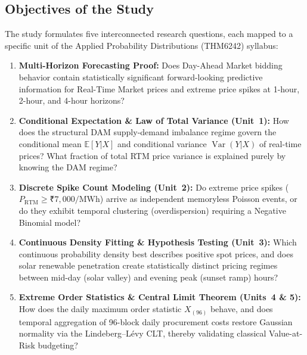 \documentclass[12pt, a4paper]{article}
\theoremstyle{definition}
\newcommand{\MWh}{\text{MWh}}
\newcommand{\rtm}{\text{RTM}}
\begin{document}
\subsection{Objectives of the Study}

The study formulates five interconnected research questions, each mapped to a specific unit of the Applied Probability Distributions (THM6242) syllabus:

\begin{enumerate}[label=\textbf{RQ\arabic*:}, leftmargin=1.5cm]
    \item \textbf{Multi-Horizon Forecasting Proof:} Does Day-Ahead Market bidding behavior contain statistically significant forward-looking predictive information for Real-Time Market prices and extreme price spikes at 1-hour, 2-hour, and 4-hour horizons?

    \item \textbf{Conditional Expectation \& Law of Total Variance (Unit~1):} How does the structural DAM supply-demand imbalance regime govern the conditional mean $\mathbb{E}[Y|X]$ and conditional variance $\operatorname{Var}(Y|X)$ of real-time prices? What fraction of total RTM price variance is explained purely by knowing the DAM regime?

    \item \textbf{Discrete Spike Count Modeling (Unit~2):} Do extreme price spikes ($P_{\rtm} \geq \text{₹}7{,}000/\MWh$) arrive as independent memoryless Poisson events, or do they exhibit temporal clustering (overdispersion) requiring a Negative Binomial model?

    \item \textbf{Continuous Density Fitting \& Hypothesis Testing (Unit~3):} Which continuous probability density best describes positive spot prices, and does solar renewable penetration create statistically distinct pricing regimes between mid-day (solar valley) and evening peak (sunset ramp) hours?

    \item \textbf{Extreme Order Statistics \& Central Limit Theorem (Units~4 \& 5):} How does the daily maximum order statistic $X_{(96)}$ behave, and does temporal aggregation of 96-block daily procurement costs restore Gaussian normality via the Lindeberg--L\'{e}vy CLT, thereby validating classical Value-at-Risk budgeting?
\end{enumerate}

\end{document}
